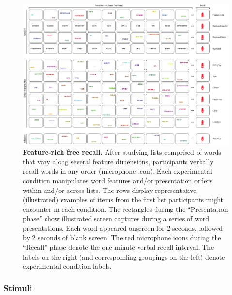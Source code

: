 \documentclass[11pt]{article}
\begin{document}
\begin{figure}[tp]
    \centering
        \includegraphics[width=\textwidth]{figures/FRFR}

\caption{\textbf{Feature-rich free recall.} After studying lists comprised of
words that vary along several feature dimensions, participants verbally recall
words in any order (microphone icon). Each experimental condition manipulates
word features and/or presentation orders within and/or across lists. The rows
display representative (illustrated) examples of items from the first list
participants might encounter in each condition. The rectangles during the
``Presentation phase'' show illustrated screen captures during a series of word
presentations. Each word appeared onscreen for 2 seconds, followed by 2 seconds
of blank screen. The red microphone icons during the ``Recall'' phase denote
the one minute verbal recall interval. The labels on the right (and
corresponding groupings on the left) denote experimental condition labels.}

    \label{fig:exp}
\end{figure}



\subsubsection*{Stimuli}
\end{document}
